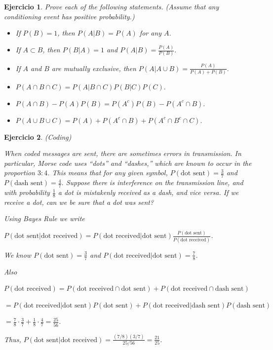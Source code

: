 \documentclass[12pt,twoside]{article}
\newtheorem{Ejer}{Ejercicio}
\begin{document}
\begin{Ejer} Prove each of the following statements. (Assume that any conditioning event has positive probability.)

\begin{itemize}
\item[(a)] If $P(B)=1$, then $P(A|B)=P(A)$ for any $A$.

\item[(b)] If $A \subset B$, then $P(B|A)=1$ and $P(A|B)=\frac{P(A)}{P(B)}.$

\item[(c)] If $A$ and $B$ are mutually exclusive, then $P(A|A \cup B)=\frac{P(A)}{P(A)+P(B)}.$

\item[(d)] $P(A \cap B \cap C)=P(A|B \cap C)P(B|C)P(C).$

\item[(e)] $P(A\cap B) - P(A)P(B)=P(A^c)P(B) - P(A^c\cap B).$

\item[(f)] $P(A\cup B\cup C)=P(A)+P(A^c\cap B)+P(A^c\cap B^c\cap C).$

\end{itemize}
\end{Ejer}


\begin{Ejer}(Coding)

When coded messages are sent, there are sometimes errors in transmission. In particular, Morse code uses ``dots'' and ``dashes,'' which are known to occur in the proportion $3:4$. This means that for any given symbol, $P(\text{dot sent}) = \frac{3}{7}$ and $P(\text{dash sent}) = \frac{4}{7}.$ Suppose there is interference on the transmission line, and with probability $\frac18$ a dot is mistakenly received as a dash, and vice versa. If we receive a dot, can we be sure that a dot was sent?

Using Bayes Rule we write

$P(\text{dot sent}|\text{dot received})=P(\text{dot received}|\text{dot sent})\frac{P(\text{dot sent})}{P(\text{dot received})}$. 

We know $P(\text{dot sent})=\frac37$ and $P(\text{dot received}|\text{dot sent})=\frac78$.

Also

$P(\text{dot received})=P(\text{dot received} \cap \text{dot sent})+P(\text{dot received} \cap \text{dash sent})$

$=P(\text{dot received}|\text{dot sent})P(\text{dot sent})+P(\text{dot received}|\text{dash sent})P(\text{dash sent})$

$=\frac78 \cdot \frac37+\frac18 \cdot \frac47=\frac{25}{56}$.

Thus, $P(\text{dot sent}|\text{dot received})=\frac{(7/8)(3/7)}{25/56}=\frac{21}{25}$.
\end{Ejer}
\end{document}
